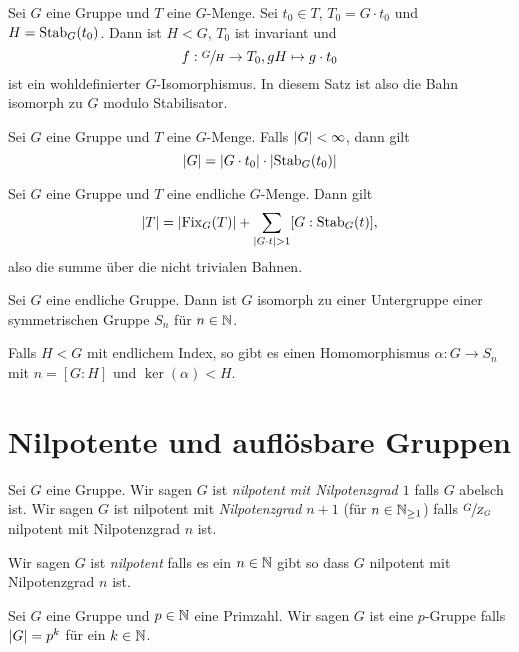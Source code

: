 \begin{theorem}
	Sei $G$ eine Gruppe und $T$ eine $G$-Menge.
	Sei $t_0 \in T$, $T_0 = G \cdot t_0$ und $H = \operatorname{Stab}_{G}(t_0)$.
	Dann ist $H < G$, $T_0$ ist invariant und 
	\[
		f: \sfrac{G}{H} \to T_0, gH \mapsto g\cdot t_0
	\]
	ist ein wohldefinierter $G$-Isomorphismus.
	In diesem Satz ist also die Bahn isomorph zu $G$ modulo Stabilisator.
\end{theorem}


\begin{corollary}
	Sei $G$ eine Gruppe und $T$ eine $G$-Menge. Falls $\abs{G} < \infty$, dann gilt 
	\[
		\abs{G} = \abs{G \cdot t_0} \cdot \abs{\operatorname{Stab}_{G}(t_0)}
	\]
\end{corollary}


\begin{corollary}
	Sei $G$ eine Gruppe und $T$ eine endliche $G$-Menge. Dann gilt
	\[
		\abs{T} = \abs{\operatorname{Fix}_{G}(T)} + \sum_{\abs{G\cdot t} > 1} [G: \operatorname{Stab}_{G}(t)]
	,\] 
	also die summe über die nicht trivialen Bahnen.
\end{corollary}


\begin{theorem}[Cayley]
	Sei $G$ eine endliche Gruppe.
	Dann ist $G$ isomorph zu einer Untergruppe einer symmetrischen Gruppe $S_{n}$ für $n \in \mathbb{N}$.
\end{theorem}


\begin{remark}
	Falls $H < G$ mit endlichem Index, so gibt es einen Homomorphismus $\alpha: G \to S_{n}$ mit $n = [G:H]$ und 
	$\ker(\alpha) < H$.
\end{remark}

\section{Nilpotente und auflösbare Gruppen}

\begin{definition}
	Sei $G$ eine Gruppe. Wir sagen $G$ ist \emph{nilpotent mit Nilpotenzgrad $1$} falls $G$ abelsch ist.
	Wir sagen $G$ ist nilpotent mit \emph{Nilpotenzgrad $n+1$} (für $n \in \mathbb{N}_{\geq 1}$) falls
	$\sfrac{G}{Z_{G}}$ nilpotent mit Nilpotenzgrad $n$ ist.

	Wir sagen $G$ ist \emph{nilpotent} falls es ein $n \in \mathbb{N}$ gibt so dass $G$ nilpotent mit Nilpotenzgrad $n$ ist.
\end{definition}


\begin{definition}
	Sei $G$ eine Gruppe und $p \in \mathbb{N}$ eine Primzahl.
	Wir sagen $G$ ist eine $p$-Gruppe falls $\abs{G} = p^{k}$ für ein $k \in \mathbb{N}$.
\end{definition}

